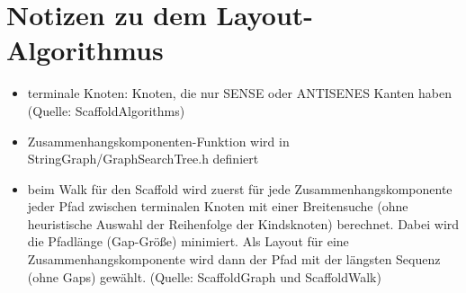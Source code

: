 \documentclass[a4paper,10pt,parskip]{scrartcl}
\begin{document}
\section{Notizen zu dem Layout-Algorithmus}

\begin{itemize}
\item terminale Knoten: Knoten, die nur SENSE oder ANTISENES Kanten
  haben (Quelle: ScaffoldAlgorithms)
\item Zusammenhangskomponenten-Funktion wird in
  StringGraph/GraphSearchTree.h definiert
\item beim Walk für den Scaffold wird zuerst für jede
  Zusammenhangskomponente jeder Pfad zwischen terminalen Knoten mit
  einer Breitensuche (ohne heuristische Auswahl der Reihenfolge der
  Kindsknoten) berechnet. Dabei wird die Pfadlänge (Gap-Größe)
  minimiert. Als Layout für eine Zusammenhangskomponente wird dann
  der Pfad mit der längsten Sequenz (ohne Gaps) gewählt. (Quelle:
  ScaffoldGraph und ScaffoldWalk)
\end{itemize}
\end{document}
